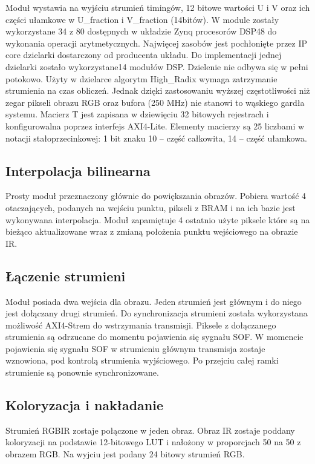 Moduł wystawia na wyjściu strumień timingów, 12 bitowe wartości U i V oraz ich części ułamkowe w U\_fraction i V\_fraction (14bitów). W module zostały wykorzystane 34 z 80 dostępnych w układzie Zynq procesorów DSP48 do wykonania operacji arytmetycznych. Najwięcej zasobów jest pochłonięte przez IP core dzielarki dostarczony od producenta układu. Do implementacji jednej dzielarki zostało wykorzystane14 modułów DSP. Dzielenie nie odbywa się w pełni potokowo. Użyty w dzielarce algorytm High\_Radix wymaga zatrzymanie strumienia na czas obliczeń. Jednak dzięki zastosowaniu wyższej częstotliwości niż zegar pikseli obrazu RGB oraz bufora (250 MHz) nie stanowi to wąskiego gardła systemu. Macierz T jest zapisana  w dziewięciu 32 bitowych rejestrach i konfigurowalna poprzez interfejs AXI4-Lite. Elementy macierzy są 25 liczbami w notacji stałoprzecinkowej: 1 bit znaku 10 – część całkowita, 14 – część ułamkowa.



\subsection{Interpolacja bilinearna}
Prosty moduł przeznaczony głównie do powiększania obrazów. Pobiera wartość 4 otaczających, podanych na wejściu punktu, pikseli z BRAM i na ich bazie jest wykonywana interpolacja. Moduł zapamiętuje 4 ostatnio użyte piksele które są na bieżąco aktualizowane wraz z zmianą położenia punktu wejściowego na obrazie IR.
\subsection{Łączenie strumieni}
Moduł posiada dwa wejścia dla obrazu. Jeden strumień jest głównym i do niego jest dołączany drugi strumień. Do synchronizacja strumieni została wykorzystana możliwość AXI4-Strem do wstrzymania transmisji. Piksele z dołączanego strumienia są odrzucane do momentu pojawienia się sygnału SOF. W momencie pojawienia się sygnału SOF w strumieniu głównym transmisja zostaje wznowiona, pod kontrolą strumienia wyjściowego. Po przejciu całej ramki strumienie są ponownie synchronizowane.  
\subsection{Koloryzacja i nakładanie}
Strumień RGBIR zostaje połączone w jeden obraz. Obraz IR zostaje poddany koloryzacji na podstawie 12-bitowego LUT i nałożony w proporcjach 50 na 50 z obrazem RGB. Na wyjciu jest podany 24 bitowy strumień RGB.

